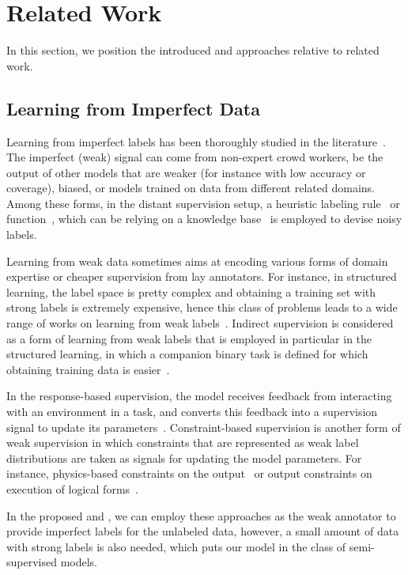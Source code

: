 \section{Related Work}
\label{sec:relatedwork}
In this section, we position the introduced \cws and \fwl approaches relative to related work.

\subsection{Learning from Imperfect Data}
Learning from imperfect labels has been thoroughly studied in the literature~\citep{Frenay:2014}.  The imperfect (weak) signal can come from non-expert crowd workers,  be the output of other models that are weaker (for instance with low accuracy or coverage), biased, or models trained on data from different related domains. 
%
Among these forms, in the distant supervision setup, a heuristic labeling rule~\citep{Deriu2016:SemEval,Severyn:2015:SemEval} or function~\citep{Dehghani:2017:SIGIR}, which can be relying on a knowledge base~\citep{Mintz2009:distant,  min2013distant, Han:2016} is employed to devise noisy labels.  

Learning from weak data sometimes aims at encoding various forms of domain expertise or cheaper supervision from lay annotators. For instance, in structured learning, the label space is pretty complex and obtaining a training set with strong labels is extremely expensive, hence this class of problems leads to a wide range of works on learning from weak labels~\citep{roth2017incidental}. 
%
Indirect supervision is considered as a form of learning from weak labels that is employed in particular in the structured learning, in which a companion binary task is defined for which obtaining training data is easier~\citep{Chang2010structured, Raghunathan:2016}. 

In the response-based supervision, the model receives feedback from interacting with an environment in a
task, and converts this feedback into a supervision
signal to update its parameters~\citep{roth2017incidental,clarke2010driving,riezler2014response}.
%
Constraint-based supervision is another form of weak supervision in which constraints that are represented as weak label distributions are taken as signals for updating the model parameters. For instance, physics-based constraints on the output~\citep{stewart2017label} or output constraints on execution of logical forms~\citep{clarke2010driving}.

In the proposed \cws and \fwl, we can employ these approaches as the weak annotator to provide imperfect labels for the unlabeled data, however, a small amount of data with strong labels is also needed, which puts our model in the class of semi-supervised models. 

